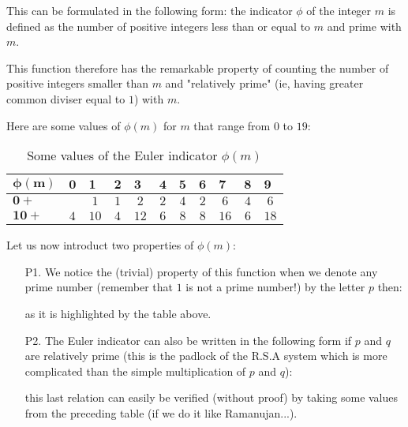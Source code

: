 	This can be formulated in the following form: the indicator $\phi$ of the integer $m$ is defined as the number of positive integers less than or equal to $m$ and prime with $m$.

	This function therefore has the remarkable property of counting the number of positive integers smaller than $m$ and "relatively prime" (ie, having greater common diviser equal to $1$) with $m$.

	Here are some values of $\phi(m)$ for $m$ that range from $0$ to $19$:
	\begin{table}[]
		\centering
		\begin{tabular}{|l|l|c|c|c|c|c|c|c|c|c|}
		\hline
		\rowcolor[HTML]{C0C0C0} 
		$\pmb{\phi(m)}$ & $\pmb{0}$ & \multicolumn{1}{l|}{\cellcolor[HTML]{C0C0C0}$\pmb{1}$} & \multicolumn{1}{l|}{\cellcolor[HTML]{C0C0C0}$\pmb{2}$} & \multicolumn{1}{l|}{\cellcolor[HTML]{C0C0C0}$\pmb{3}$} & \multicolumn{1}{l|}{\cellcolor[HTML]{C0C0C0}$\pmb{4}$} & \multicolumn{1}{l|}{\cellcolor[HTML]{C0C0C0}$\pmb{5}$} & \multicolumn{1}{l|}{\cellcolor[HTML]{C0C0C0}$\pmb{6}$} & \multicolumn{1}{l|}{\cellcolor[HTML]{C0C0C0}$\pmb{7}$} & \multicolumn{1}{l|}{\cellcolor[HTML]{C0C0C0}$\pmb{8}$} & \multicolumn{1}{l|}{\cellcolor[HTML]{C0C0C0}$\pmb{9}$} \\ \hline
		\cellcolor[HTML]{C0C0C0}$\pmb{0+}$ &  & $1$ & $1$ & $2$ & $2$ & $4$ & $2$ & $6$ & $4$ & $6$ \\ \hline
		\cellcolor[HTML]{C0C0C0}$\pmb{10+}$ & \multicolumn{1}{c|}{$4$} & $10$ & $4$ & $12$ & $6$ & $8$ & $8$ & $16$ & $6$ & $18$ \\ \hline
		\end{tabular}
		\caption{Some values of the Euler indicator $\phi(m)$}
	\end{table}
	Let us now introduct two properties of $\phi(m)$:
	\begin{enumerate}
		\item[P1.] We notice the (trivial) property of this function when we denote any prime number (remember that $1$ is not a prime number!) by the letter $p$ then:
		
		as it is highlighted by the table above.
	
		\item[P2.] The Euler indicator can also be written in the following form if $p$ and $q$ are relatively prime (this is the padlock of the R.S.A system which is more complicated than the simple multiplication of $p$ and $q$):
		
		this last relation can easily be verified (without proof) by taking some values from the preceding table (if we do it like Ramanujan...).
	\end{enumerate}
